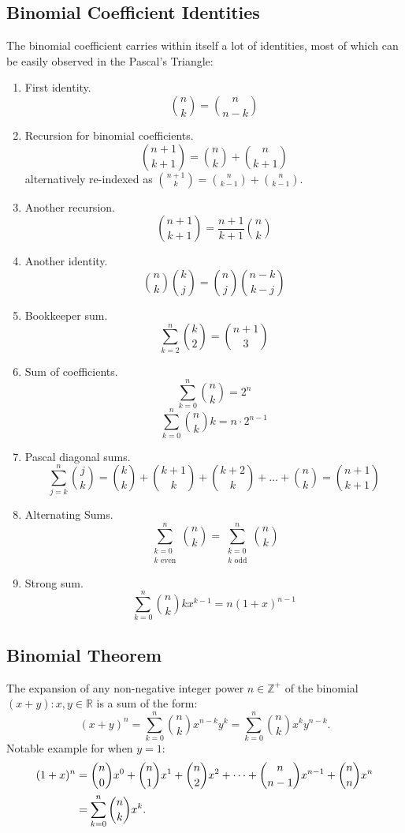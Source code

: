\documentclass{article}
\newenvironment{theorem}[1]{%
    \trivlist
    \item[\hskip\labelsep\textbf{Theorem. #1.}]
    \ignorespaces
}{%
    \endtrivlist
}
\newenvironment{identities}[1]{%
    \trivlist
    \item[\hskip\labelsep\textbf{Identities. #1.}]
    \ignorespaces
}{%
    \endtrivlist
}
\begin{document}
\subsection{Binomial Coefficient Identities}

\begin{identities}{Binomial Coefficient}
    The binomial coefficient carries within itself a lot of identities, most of which can be easily observed in the Pascal's Triangle:
    \begin{enumerate}
        \item First identity.
        \[\binom{n}{k}=\binom{n}{n-k}\]
        \item Recursion for binomial coefficients.
        \[\binom{n+1}{k+1}=\binom{n}{k}+\binom{n}{k+1}\]
        alternatively re-indexed as $\binom{n+1}{k}=\binom{n}{k-1}+\binom{n}{k-1}$.
        \item Another recursion.
        \[\binom{n+1}{k+1} = \frac{n+1}{k+1} \binom{n}{k}\]
        \item Another identity.
        \[\binom{n}{k}\binom{k}{j} = \binom{n}{j}\binom{n-k}{k-j}\]
        \item Bookkeeper sum.
        \[\sum_{k=2}^{n} \binom{k}{2} = \binom{n+1}{3}\]
        \item Sum of coefficients.
        \[\sum_{k=0}^{n} \binom{n}{k} = 2^n\]
        \[\sum_{k=0}^{n} \binom{n}{k} k = n \cdot 2^{n-1}\]
        \item Pascal diagonal sums.
        \[\sum_{j=k}^{n} \binom{j}{k}=\binom{k}{k} + \binom{k+1}{k} + \binom{k+2}{k} + \dots + \binom{n}{k} = \binom{n+1}{k+1}\]
        \item Alternating Sums.
        \[\sum_{\substack{k=0 \\ k \text{ even}}}^{n} \binom{n}{k} =\sum_{\substack{k=0 \\ k \text{ odd}}}^{n} \binom{n}{k}\]
        \item Strong sum.
        \[\sum_{k=0}^{n} \binom{n}{k} kx^{k-1} = n(1+x)^{n-1}\]
    \end{enumerate}
\end{identities}

\subsection{Binomial Theorem}

\begin{theorem}{Binomial Theorem}
    The expansion of any non-negative integer power $n\in\mathbb{Z}^{+}$ of the binomial $(x + y): x,y\in\mathbb{R}$ is a sum of the form:
    \[ (x+y)^{n}=\sum _{k=0}^{n} \binom{n}{k} x^{n-k}y^{k}=\sum _{k=0}^{n} \binom{n}{k} x^{k}y^{n-k}. \]
    Notable example for when $y=1$:
    $$
    \begin{aligned}
        (1+x)^{n}&=\binom{n}{0}x^{0}+\binom{n}{1}x^{1}+\binom{n}{2}x^{2}+\cdots +\binom{n}{n-1}x^{n-1}+\binom{n}{n}x^{n}\\
        &=\sum _{k=0}^{n}\binom{n}{k}x^{k}.{\vphantom {\Bigg )}}
    \end{aligned}
    $$
\end{theorem}
\end{document}
